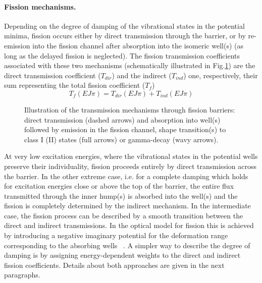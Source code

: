 \paragraph*{Fission mechanisms.}

Depending on the degree of damping of the vibrational states in the
potential minima, fission occurs either by direct transmission through the
barrier, or by re-emission into the fission channel after absorption into
the isomeric well(s) (as long as the delayed fission is neglected). The
fission transmission coefficients associated with these two mechanisms
(schematically illustrated in Fig.\ref{fis-mech}) are the direct
transmission coefficient ($T_{dir}$) and the indirect ($T_{ind}$) one,
respectively, their sum representing the total fission coefficient ($T_{f}$)
\begin{equation}
T_{f}(EJ\pi)=T_{dir}(EJ\pi)+T_{ind}(EJ\pi)  \label{tf}
\end{equation}
\begin{figure}[htbp]
\caption{Illustration of the transmission mechanisms through fission
barriers: direct transmission (dashed arrows) and absorption into well(s)
followed by emission in the fission channel, shape transition(s) to class I
(II) states (full arrows) or gamma-decay (wavy arrows).}
\label{fis-mech}
\end{figure}
At very low excitation energies, where the vibrational states in the
potential wells preserve their individuality, fission proceeds entirely by
direct transmission across the barrier. In the other extreme case, i.e. for
a complete damping which holds for excitation energies close or above the
top of the barrier, the entire flux transmitted through the inner hump(s) is
absorbed into the well(s) and the fission is completely determined by the
indirect mechanism. In the intermediate case, the fission process can be
described by a smooth transition between the direct and indirect
transmissions. In the optical model for fission this is achieved by
introducing a negative imaginary potential for the deformation range
corresponding to the absorbing wells ~\cite{Bhandari:79, Back:74}. A
simpler way to describe the degree of damping is by assigning
energy-dependent weights to the direct and indirect fission coefficients.
Details about both approaches are given in the next paragraphs.

